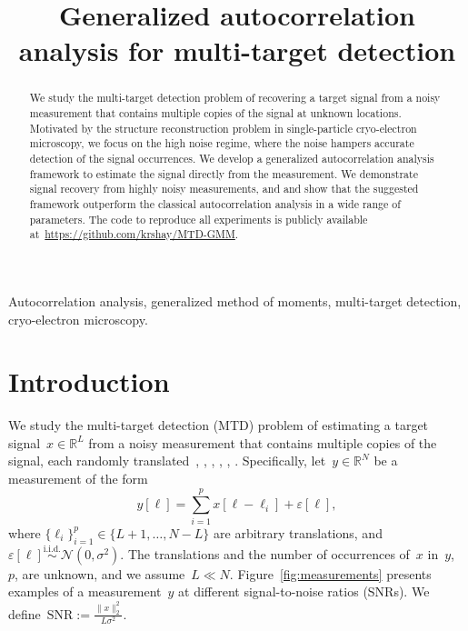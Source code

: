 \documentclass{article}
\title{Generalized autocorrelation analysis for multi-target detection}
\begin{document}
\ninept
%
\maketitle
%
\begin{abstract}
We study the multi-target detection problem of recovering a target signal from a noisy measurement that contains multiple copies of the signal at unknown locations. Motivated by the structure reconstruction problem in single-particle cryo-electron microscopy, we focus on the high noise regime, where the noise hampers accurate detection of the signal occurrences. We develop a generalized autocorrelation analysis framework to estimate the signal directly from the measurement. We demonstrate signal recovery from highly noisy measurements, and and show that the suggested framework outperform the classical autocorrelation analysis in a wide range of parameters. The code to reproduce all experiments is publicly available at~\url{https://github.com/krshay/MTD-GMM}.
\end{abstract}
%
\begin{keywords}
Autocorrelation analysis, generalized method of moments, multi-target detection, cryo-electron microscopy.
\end{keywords}
%
\section{Introduction}
\label{sec:intro}
We study the multi-target detection (MTD) problem of estimating a target signal~$x \in \mathbb{R}^L$ from a noisy measurement that contains multiple copies of the signal, each randomly translated~\cite{bendory2019multi}, \cite{lan2020multi}, \cite{marshall2020image}, \cite{bendory2021multi}, \cite{kreymer2021two}, \cite{bendory2018toward}. Specifically, let~$y \in \mathbb{R}^N$ be a measurement of the form
\begin{equation}
\label{eq:model}
y[\ell] = \sum_{i=1}^{p} x[\ell - \ell_i] + \varepsilon[\ell],
\end{equation}
where \mbox{$\{\ell_i\}_{i=1}^{p} \in \{L + 1, \ldots, N-L\}$} are arbitrary translations, and~$\varepsilon[\ell]\overset{\text{i.i.d.}}{\sim} \mathcal{N}(0,\sigma^2)$. The translations and the number of occurrences of~$x$ in~$y$,~$p$, are unknown, and we assume~$L \ll N$. Figure~\ref{fig:measurements} presents examples of a measurement~$y$ at different signal-to-noise ratios (SNRs). We define~\mbox{$\text{SNR} := \frac{\|x\|_2^2}{L \sigma^2}$}.
\end{document}

